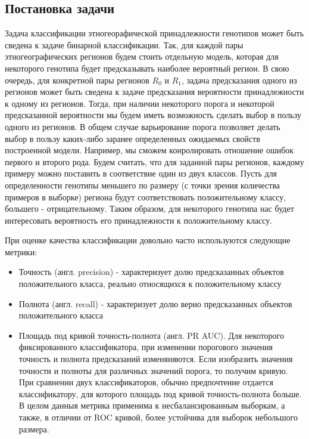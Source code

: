 \subsection{Постановка задачи}

Задача классификации этногеорафической принадлежности генотипов может быть сведена
к задаче бинарной классификации. Так, для каждой пары этногеографических регионов будем
стоить отдельную модель, которая для некоторого генотипа будет предсказывать наиболее вероятный
регион. В свою очередь, для конкретной пары регионов $R_{0}$ и $R_{1}$, задача предсказания
одного из регионов может быть сведена к задаче предсказания вероятности принадлежности к одному
из регионов. Тогда, при наличии некоторого порога и некоторой предсказанной вероятности
мы будем иметь возможность сделать выбор в пользу одного из регионов. В общем случае
варьирование порога позволяет делать выбор в пользу каких-либо заранее определенных
ожидаемых свойств построенной модели. Например, мы сможем конролировать отношение ошибок первого
и второго рода. Будем считать, что для заданной пары регионов, каждому примеру можно поставить в соответствие
один из двух классов. Пусть для определенности генотипы меньшего по размеру (с точки зрения
количества примеров в выборке) региона будут соответствовать положительному классу, большего - отрицательному.
Таким образом, для некоторого генотипа нас будет интересовать вероятность его принадлежности
к положительному классу.

При оценке качества классификации довольно часто используются следующие метрики:

\begin{itemize}
\item Точность (англ. precision) - характеризует долю предсказанных объектов положительного класса,
реально относящихся к положительному классу

\item Полнота (англ. recall) - характеризует долю верно предсказанных объектов положительного класса

\item Площадь под кривой точность-полнота (англ. PR AUC). Для некоторого фиксированного классификатора,
при изменении порогового значения точность и полнота предсказаний изменяняются.
Если изобразить значения точности и полноты для различных значений порога, то получим
кривую. При сравнении двух классификаторов, обычно предпочтение отдается классификатору,
для которого площадь под кривой точность-полнота больше. В целом данныя метрика применима
к несбалансированным выборкам, а также, в отличии от ROC кривой, более устойчива для
выборок небольшого размера.
\end{itemize}

